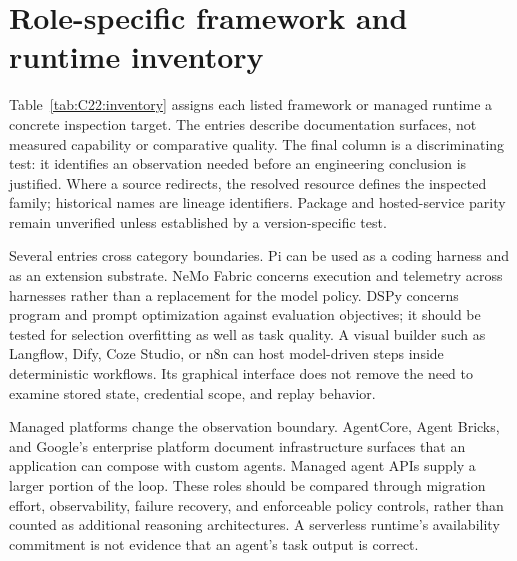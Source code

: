 \section{Role-specific framework and runtime inventory}\label{sec:C22:inventory}
Table~\ref{tab:C22:inventory} assigns each listed framework or managed runtime a concrete inspection target. The entries describe documentation surfaces, not measured capability or comparative quality. The final column is a discriminating test: it identifies an observation needed before an engineering conclusion is justified. Where a source redirects, the resolved resource defines the inspected family; historical names are lineage identifiers. Package and hosted-service parity remain unverified unless established by a version-specific test.


Several entries cross category boundaries. Pi can be used as a coding harness and as an extension substrate. NeMo Fabric concerns execution and telemetry across harnesses rather than a replacement for the model policy. DSPy concerns program and prompt optimization against evaluation objectives; it should be tested for selection overfitting as well as task quality. A visual builder such as Langflow, Dify, Coze Studio, or n8n can host model-driven steps inside deterministic workflows. Its graphical interface does not remove the need to examine stored state, credential scope, and replay behavior.

Managed platforms change the observation boundary. AgentCore, Agent Bricks, and Google's enterprise platform document infrastructure surfaces that an application can compose with custom agents. Managed agent APIs supply a larger portion of the loop. These roles should be compared through migration effort, observability, failure recovery, and enforceable policy controls, rather than counted as additional reasoning architectures. A serverless runtime's availability commitment is not evidence that an agent's task output is correct.

